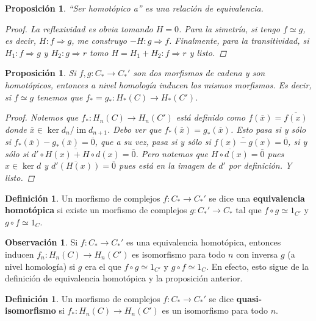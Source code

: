 \documentclass[12pt]{book}
\newtheorem{prop}[teo]{Proposición}
\theoremstyle{definition}
\newtheorem{obs}[teo]{Observación}
\newtheorem{defn}[teo]{Definición}
\DeclareMathOperator{\im}{im}
\begin{document}
\begin{prop}
"`Ser homotópico a"' es una relación de equivalencia.
\begin{proof}
La reflexividad es obvia tomando $H=0$. Para la simetría, si tengo $f\simeq g$, es decir, $H:f\Longrightarrow g$, me construyo $-H:g\Longrightarrow f$. Finalmente, para la transitividad, si $H_1:f\Longrightarrow g$ y $H_2:g\Longrightarrow r$ tomo $H=H_1+H_2:f\Longrightarrow r$ y listo.
\end{proof}
\end{prop}

\begin{prop}
Si $f,g:C_*\to C_*'$ son dos morfismos de cadena y son homotópicos, entonces a nivel homología inducen los mismos morfismos. Es decir, si $f\simeq g$ tenemos que $f_* = g_* : H_*(C)\to H_*(C')$.

\begin{proof}

Notemos que $f_*:H_n(C)\to H_n(C')$ está definido como $f(\overline{x})=\overline{f(x)}$ donde $\overline{x}\in\ker d_n/\im d_{n+1}$. Debo ver que $f_*(\overline{x})=g_*(\overline{x})$. Esto pasa si y sólo si $f_*(\overline{x})-g_*(\overline{x})=\overline{0}$, que a su vez, pasa si y sólo si $\overline{f(x)-g(x)} = \overline{0}$, si y sólo si $\overline{d'\circ H(x) + H\circ d(x)}=\overline{0}$. Pero notemos que $\overline{H\circ d(x)}=\overline{0}$ pues $x\in \ker d$ y $\overline{d'(H(x))}=\overline{0}$ pues está en la imagen de $d'$ por definición. Y listo.

\end{proof}
\end{prop}

\begin{defn}
Un morfismo de complejos $f:C_*\to C_*'$ se dice una \textbf{equivalencia homotópica} si existe un morfismo de complejos $g:C_*'\to C_*$ tal que $f\circ g\simeq 1_{C'}$ y $g\circ f\simeq 1_C$.
\end{defn}

\begin{obs}
Si $f:C_*\to C_*'$ es una equivalencia homotópica, entonces inducen $f_n:H_n(C)\to H_n(C')$ es isomorfismo para todo $n$ con inversa $g$ (a nivel homología) si $g$ era el que $f\circ g\simeq 1_{C'}$ y $g\circ f\simeq 1_C$. En efecto, esto sigue de la definición de equivalencia homotópica y la proposición anterior.
\end{obs}

\begin{defn}
Un morfismo de complejos $f:C_*\to C_*'$ se dice \textbf{quasi-isomorfismo} si $f_*:H_n(C)\to H_n(C')$ es un isomorfismo para todo $n$.
\end{defn}
\end{document}
